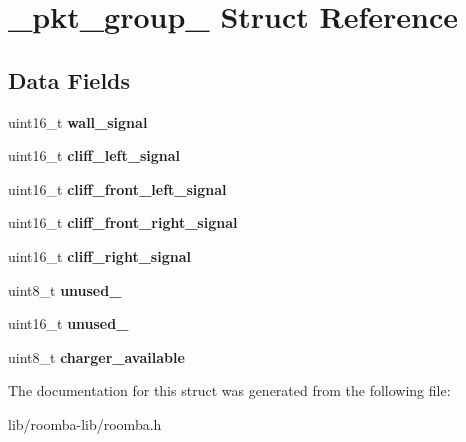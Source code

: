 \hypertarget{struct__pkt__group__4}{}\section{\+\_\+pkt\+\_\+group\+\_ Struct Reference}
\label{struct__pkt__group__4}
\subsection*{Data Fields}
\begin{DoxyCompactItemize}
\item 
\hypertarget{group__roomba-lib_ga25dfb5758c3481928fd01259472581f5}{}uint16\+\_\+t {\bfseries wall\+\_\+signal}\label{group__roomba-lib_ga25dfb5758c3481928fd01259472581f5}

\item 
\hypertarget{group__roomba-lib_ga91ffc6b1dc09dc3d418c2394c5435fa3}{}uint16\+\_\+t {\bfseries cliff\+\_\+left\+\_\+signal}\label{group__roomba-lib_ga91ffc6b1dc09dc3d418c2394c5435fa3}

\item 
\hypertarget{group__roomba-lib_gab156cf15990c58a4a61ecb6a268ebfa4}{}uint16\+\_\+t {\bfseries cliff\+\_\+front\+\_\+left\+\_\+signal}\label{group__roomba-lib_gab156cf15990c58a4a61ecb6a268ebfa4}

\item 
\hypertarget{group__roomba-lib_ga6ad7056b713673503898d022ef765f6e}{}uint16\+\_\+t {\bfseries cliff\+\_\+front\+\_\+right\+\_\+signal}\label{group__roomba-lib_ga6ad7056b713673503898d022ef765f6e}

\item 
\hypertarget{group__roomba-lib_gaa3fa03339974ede4ab6ba0215532da2b}{}uint16\+\_\+t {\bfseries cliff\+\_\+right\+\_\+signal}\label{group__roomba-lib_gaa3fa03339974ede4ab6ba0215532da2b}

\item 
\hypertarget{group__roomba-lib_gab54ab066eb72c6597b14857b03e98458}{}uint8\+\_\+t {\bfseries unused\+\_}\label{group__roomba-lib_gab54ab066eb72c6597b14857b03e98458}

\item 
\hypertarget{group__roomba-lib_gaedbbfb65e01c007f84cfd034208152c0}{}uint16\+\_\+t {\bfseries unused\+\_}\label{group__roomba-lib_gaedbbfb65e01c007f84cfd034208152c0}

\item 
\hypertarget{group__roomba-lib_gaf2998b6db33b57101022655fbae35d4d}{}uint8\+\_\+t {\bfseries charger\+\_\+available}\label{group__roomba-lib_gaf2998b6db33b57101022655fbae35d4d}

\end{DoxyCompactItemize}


The documentation for this struct was generated from the following file\+:\begin{DoxyCompactItemize}
\item 
lib/roomba-\/lib/roomba.\+h\end{DoxyCompactItemize}
